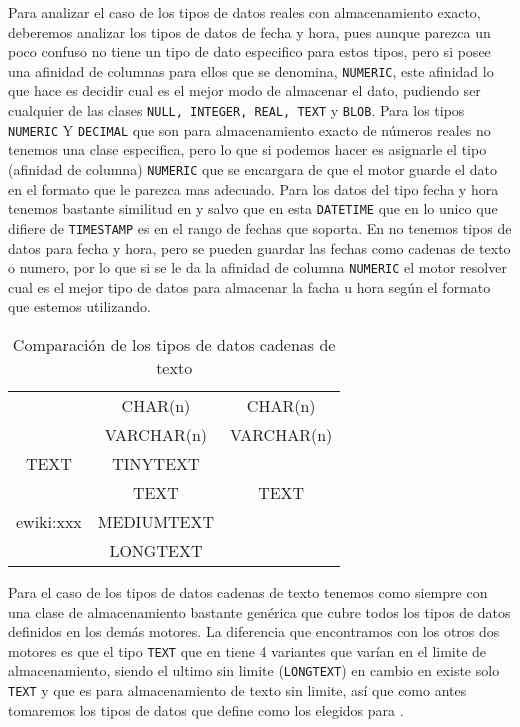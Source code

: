 Para analizar el caso de los tipos de datos reales con almacenamiento exacto, deberemos analizar los tipos de datos de fecha y hora, pues aunque parezca un poco confuso \s no tiene un tipo de dato especifico para estos tipos, pero si posee una afinidad de columnas para ellos que se denomina, \verb=NUMERIC=, este afinidad lo que hace es decidir cual es el mejor modo de almacenar el dato, pudiendo ser cualquier de las clases \verb=NULL, INTEGER, REAL, TEXT= y \verb=BLOB=. Para los tipos \verb=NUMERIC= Y \verb=DECIMAL= que son para almacenamiento exacto de números reales no tenemos una clase especifica, pero lo que si podemos hacer es asignarle el tipo (afinidad de columna) \verb=NUMERIC= que se encargara de que el motor guarde el dato en el formato que le parezca mas adecuado. Para los datos del tipo fecha y hora tenemos bastante similitud  en \m y \p salvo que en \m esta \verb=DATETIME= que en lo unico que difiere de \verb=TIMESTAMP= es en el rango de fechas que soporta. En \s no tenemos tipos de datos para fecha y hora, pero se pueden guardar las fechas como cadenas de texto o numero, por lo que si se le da la afinidad de columna \verb=NUMERIC= el motor resolver cual es el mejor tipo de datos para almacenar la facha u hora según el formato que estemos utilizando.   

\begin{table}[h]
\begin{center}
\begin{tabular}{|c|c|c|}
\hline \s & \m & \p \\ 
\hline  & CHAR(n) & CHAR(n) \\  
    & VARCHAR(n) & VARCHAR(n) \\ 
  TEXT   & TINYTEXT &  \\  
    & TEXT & TEXT \\  e{wiki:xxx}
    & MEDIUMTEXT &  \\  
    & LONGTEXT &  \\  
\hline 
\end{tabular} 
\end{center}
\caption{Comparación de los tipos de datos cadenas de texto}
\end{table}

Para el caso de los tipos de datos cadenas de texto tenemos como siempre \s con una clase de almacenamiento bastante genérica que cubre todos los tipos de datos definidos en los demás motores. La diferencia que encontramos con los otros dos motores es que el tipo \verb=TEXT= que en \m tiene 4 variantes que varían en el limite de almacenamiento, siendo el ultimo sin limite (\verb=LONGTEXT=) en cambio en \p existe solo \verb=TEXT= y que es para almacenamiento de texto sin limite, así que como antes tomaremos los tipos de datos que define \p como los elegidos para \cc. 

